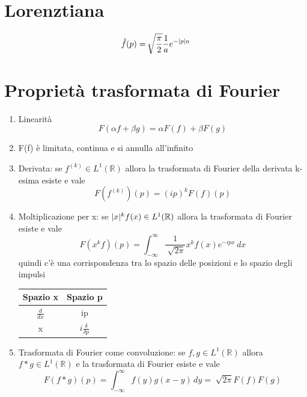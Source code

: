 \documentclass[a4paper,11pt]{report}
\theoremstyle{remark}
\theoremstyle{definition}
\newcommand{\R}{\mathbb{R}}
\DeclarePairedDelimiter{\abs}{\lvert}{\rvert}
\begin{document}
\section{Lorenztiana}

\begin{equation*}
	\hat{f}(p) = \, \sqrt[]{\frac{\pi}{2}}\frac{1}{a} e^{-\abs{p}a}
\end{equation*}

\section{Proprietà trasformata di Fourier}

\begin{enumerate}
	\item Linearità
	\begin{equation*}
		F(\alpha f + \beta g) = \alpha F(f) + \beta F(g)
	\end{equation*}
	\item F(f) è limitata, continua e si annulla all'infinito
 \item Derivata: se $f^{(k)}\in L^1(\R)$ allora la trasformata di Fourier della derivata k-esima esiste e vale
\begin{equation*}
	F(f^{(k)})(p) = {(ip)}^k F(f)(p)
\end{equation*}
\item Moltiplicazione per x: se $\abs{x}^kf(x) \in L^1(\R)$ allora la trasformata di Fourier esiste e vale 
\begin{equation*}
	F(x^kf)(p) = \int_{-\infty}^\infty \frac{1}{\sqrt[]{2\pi}} x^k f(x)e^{-ipx} \, dx 
\end{equation*}
quindi c'è una corrispondenza tra lo spazio delle posizioni e lo spazio degli impulsi
\begin{center}
\begin{tabular}[H]{|c|c|}
	\hline
	Spazio x & Spazio p \\
	\hline
	$\frac{d}{dx}$ & ip \\
	x & $i\frac{\delta}{\delta p}$ \\
	\hline
\end{tabular}
\end{center}
\item Trasformata di Fourier come convoluzione: se $f,g \in L^1(\R)$ allora $f*g \in L^1(\R)$ e la trasformata di Fourier esiste e vale
\begin{equation*}
	F(f*g)(p) = \int_{-\infty}^\infty f(y)g(x-y) \, dy = \sqrt[]{2\pi} F(f)F(g)
\end{equation*}
\end{enumerate}
\end{document}
